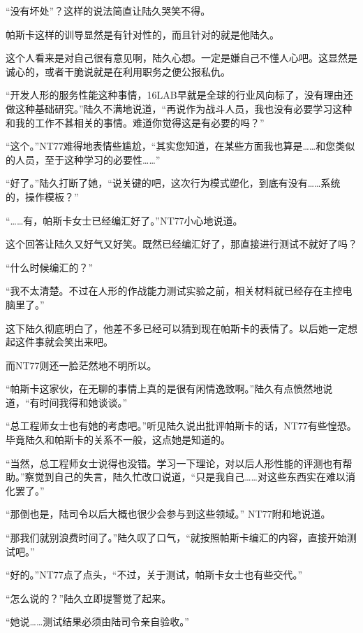 “没有坏处”？这样的说法简直让陆久哭笑不得。

帕斯卡这样的训导显然是有针对性的，而且针对的就是他陆久。

这个人看来是对自己很有意见啊，陆久心想。一定是嫌自己不懂人心吧。这显然是诚心的，或者干脆说就是在利用职务之便公报私仇。

“开发人形的服务性能这种事情，16LAB早就是全球的行业风向标了，没有理由还做这种基础研究。”陆久不满地说道，“再说作为战斗人员，我也没有必要学习这种和我的工作不甚相关的事情。难道你觉得这是有必要的吗？”

“这个。”NT77难得地表情些尴尬，“其实您知道，在某些方面我也算是……和您类似的人员，至于这种学习的必要性……”

“好了。”陆久打断了她，“说关键的吧，这次行为模式塑化，到底有没有……系统的，操作模板？”

“……有，帕斯卡女士已经编汇好了。”NT77小心地说道。

这个回答让陆久又好气又好笑。既然已经编汇好了，那直接进行测试不就好了吗？

“什么时候编汇的？”

“我不太清楚。不过在人形的作战能力测试实验之前，相关材料就已经存在主控电脑里了。”

这下陆久彻底明白了，他差不多已经可以猜到现在帕斯卡的表情了。以后她一定想起这件事就会笑出来吧。

而NT77则还一脸茫然地不明所以。

“帕斯卡这家伙，在无聊的事情上真的是很有闲情逸致啊。”陆久有点愤然地说道，“有时间我得和她谈谈。”

“总工程师女士也有她的考虑吧。”听见陆久说出批评帕斯卡的话，NT77有些惶恐。毕竟陆久和帕斯卡的关系不一般，这点她是知道的。

“当然，总工程师女士说得也没错。学习一下理论，对以后人形性能的评测也有帮助。”察觉到自己的失言，陆久忙改口说道，“只是我自己……对这些东西实在难以消化罢了。”

“那倒也是，陆司令以后大概也很少会参与到这些领域。” NT77附和地说道。

“那我们就别浪费时间了。”陆久叹了口气，“就按照帕斯卡编汇的内容，直接开始测试吧。”

“好的。”NT77点了点头，“不过，关于测试，帕斯卡女士也有些交代。”

“怎么说的？”陆久立即提警觉了起来。

“她说……测试结果必须由陆司令亲自验收。”